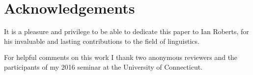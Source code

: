 \documentclass[output=paper]{langsci/langscibook}
\begin{document}
\printchapterglossary{}

\section*{Acknowledgements}

It is a pleasure and privilege to be able to dedicate this paper to Ian
Roberts, for his invaluable and lasting contributions to the field of
linguistics.

For helpful comments on this work I thank two anonymous reviewers and the
participants of my 2016 seminar at the University of Connecticut.

{\sloppy
\printbibliography[heading=subbibliography,notkeyword=this]
}
\end{document}
